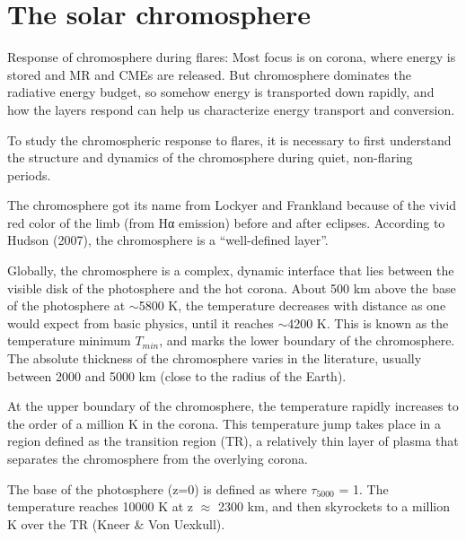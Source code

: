 \clearpage
\section{The solar chromosphere}




Response of chromosphere during flares:
Most focus is on corona, where energy
is stored and MR and CMEs are released.
But chromosphere dominates the
radiative energy budget, so somehow energy is transported down rapidly, and how
the layers respond can help us characterize energy transport and
conversion.%
%




To study the chromospheric response to flares, it is necessary
to first understand the structure and dynamics of the chromosphere
during quiet, non-flaring periods.

The chromosphere got its name from Lockyer and Frankland because of the vivid
red color of the limb (from Hα emission) before and after eclipses.
According to Hudson (2007), the chromosphere is a ``well-defined layer''.

Globally, the chromosphere is a complex, dynamic interface that lies between
the visible disk of the photosphere and the hot corona.
About 500 km above the base of the photosphere at $\sim$5800 K, the temperature
decreases with distance as one would expect from basic physics,
until it reaches $\sim$4200 K.
This is known as the temperature minimum $T_{min}$, and
marks the lower boundary of the chromosphere.
The absolute
thickness of the chromosphere varies in the literature, usually between 2000
and 5000 km (close to the radius of the Earth).

At the upper boundary of the chromosphere, the temperature rapidly increases to
the order of a million K in the corona.
This temperature jump takes place in a region defined as the transition
region (TR), a relatively thin layer of plasma that separates the chromosphere
from the overlying corona.

The base of the photosphere (z=0) is defined as where
$\tau_{5000}$ = 1.
The temperature reaches 10000 K at z $\approx$ 2300 km, and then skyrockets
to a million K over the TR (Kneer \& Von Uexkull).


